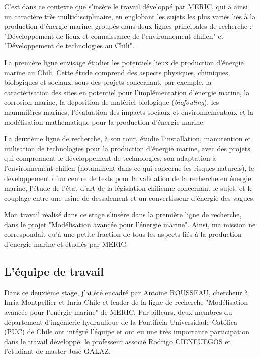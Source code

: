 \indent C'est dans ce contexte que s'insère le travail développé par MERIC, qui a ainsi un caractère très multidisciplinaire, en englobant les sujets les plus variés liés à la production d'énergie marine, groupés dans deux lignes principales de recherche : "Développement de lieux et connaissance de l'environnement chilien" et "Développement de technologies au Chili".

\indent La première ligne envisage étudier les potentiels lieux de production d'énergie marine au Chili. Cette étude comprend des aspects physiques, chimiques, biologiques et sociaux, sous des projets concernant, par exemple, la caractérisation des sites en potentiel pour l'implémentation d'énergie marine, la corrosion marine, la déposition de matériel biologique (\emph{biofouling}), les mammifères marines, l'évaluation des impacts sociaux et environnementaux et la modélisation mathématique pour la production d'énergie marine.

\indent La deuxième ligne de recherche, à son tour, étudie l'installation, manutention et utilisation de technologies pour la production d'énergie marine, avec des projets qui comprennent le développement de technologies, son adaptation à l'environnement chilien (notamment dans ce qui concerne les risques naturels), le développement d'un centre de tests pour la validation de la recherche en énergie marine, l'étude de l'état d'art de la législation chilienne concernant le sujet, et le couplage entre une usine de dessalement et un convertisseur d'énergie des vagues.

\indent Mon travail réalisé dans ce stage s'insère dans la première ligne de recherche, dans le projet "Modélisation avancée pour l'énergie marine". Ainsi, ma mission ne correspondait qu'à une petite fraction de tous les aspects liés à la production d'énergie marine et étudiés par MERIC.

\subsection{L'équipe de travail}

\indent Dans ce deuxième stage, j'ai été encadré par Antoine ROUSSEAU, chercheur à Inria Montpellier et Inria Chile et leader de la ligne de recherche "Modélisation avancée pour l'enérgie marine" de MERIC. Par ailleurs, deux membres du département d'ingénierie hydraulique de la Pontifícia  Universidade Católica (PUC) de Chile ont intégré l'équipe et ont eu une très importante participation dans le travail développé: le professeur associé Rodrigo CIENFUEGOS et l'étudiant de master José GALAZ.

